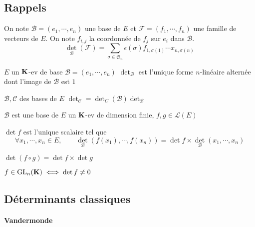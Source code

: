 \subsection{Rappels}

On note $\mathcal  B=(e_1, \cdots , e_n)$ une base de $E$ et  $\mathcal  F=(f_1, \cdots , f_n)$ une famille de vecteurs de $E$. On note  $f_{i,j}$ la coordonnée de $f_j$ sur  $e_i$ dans $\mathcal  B$. \[
    \det_{\mathcal  B}(\mathcal  F)=\sum_{\sigma \in  \mathfrak S_n}\epsilon(\sigma)f_{1,\sigma(1)}\cdots x_{n, \sigma(n)}
\] 

\begin{thm}
    \Hyp $E$ un  $\mathbf K$-ev de base $\mathcal  B=(e_1, \cdots , e_n)$
    \Conc $\det_{\mathcal  B}$ est l'unique forme $n$-linéaire alternée dont l'image de $\mathcal  B$ est $1$
\end{thm}

\begin{prop}
\Hyp $\mathcal  B, \mathcal  C$ des bases de $E$
\Conc  $\det_{\mathcal  C}=\det_C(\mathcal  B)\det_{\mathcal  B}$
\end{prop}

\begin{defprop}
    \Hyp $\mathcal  B$ est une base de $E$ un $\mathbf K$-ev de dimension finie,  $f,g \in  \mathcal  L(E)$
    \begin{concenum}
    \item $\det f$ est l'unique scalaire tel que  \[
            \forall  x_1, \cdots , x_n \in  E, \qquad  \det_{\mathcal  B}(f(x_1), \cdots , f(x_n))=\det f\times \det_{\mathcal  B}(x_1, \cdots , x_n)
    \] 
\item $\det(f \circ g)=\det f \times \det g$
\item  $f \in  \mathrm{GL}_n(\mathbf K) \iff  \det f \neq 0$
    \end{concenum}
\end{defprop}

\subsection{Déterminants classiques}

\paragraph{Vandermonde}

